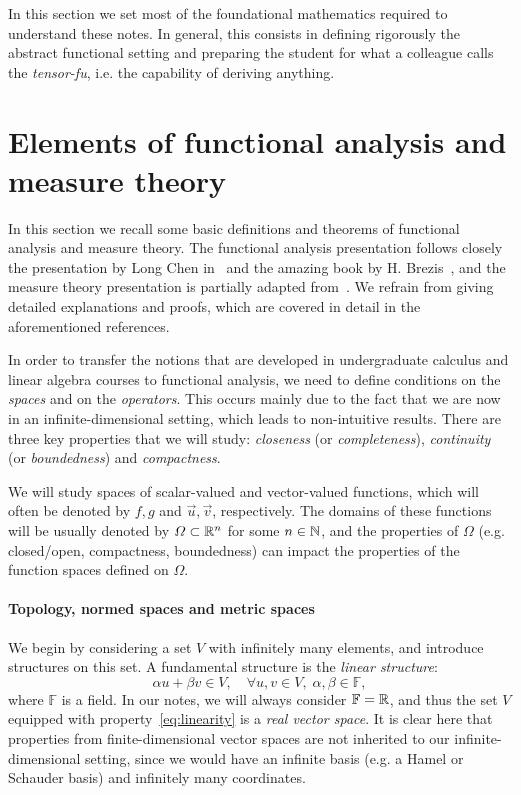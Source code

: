 In this section we set most of the foundational mathematics required to understand these notes. In general, this consists in defining rigorously the abstract functional setting and preparing the student for what a colleague calls the \emph{tensor-fu}, i.e. the capability of deriving anything.

\section{Elements of functional analysis and measure theory}\label{sec:elements-functional-analysis}
In this section we recall some basic definitions and theorems of functional analysis and measure theory. The functional analysis presentation follows closely the presentation by Long Chen in~\cite{chen2024infSup} and the amazing book by H. Brezis~\cite{BrezisFA}, and the measure theory presentation is partially adapted from~\cite{Tao_2021,Rudin_2013}. We refrain from giving detailed explanations and proofs, which are covered in detail in the aforementioned references.

In order to transfer the notions that are developed in undergraduate calculus and linear algebra courses to functional analysis, we need to define conditions on the \emph{spaces} and on the \emph{operators}. This occurs mainly due to the fact that we are now in an infinite-dimensional setting, which leads to non-intuitive results. There are three key properties that we will study: \emph{closeness} (or \emph{completeness}), \emph{continuity} (or \emph{boundedness}) and \emph{compactness}.

We will study spaces of scalar-valued and vector-valued functions, which will often be denoted by $f, g$ and $\vec u, \vec v$, respectively. The domains of these functions will be usually denoted by $\Omega\subset\mathbb{R}^n$ for some $n\in\mathbb{N}$, and the properties of $\Omega$ (e.g. closed/open, compactness, boundedness) can impact the properties of the function spaces defined on $\Omega$.

\paragraph{Topology, normed spaces and metric spaces}
We begin by considering a set $V$ with infinitely many elements, and introduce structures on this set. A fundamental structure is the \emph{linear structure}:
\begin{equation}\label{eq:linearity}
    \alpha u + \beta v \in V,\quad \forall u,v\in V, \; \alpha, \beta\in \mathbb{F},
\end{equation}
where $\mathbb{F}$ is a field. In our notes, we will always consider $\mathbb{F}=\mathbb{R}$, and thus the set $V$ equipped with property~\eqref{eq:linearity} is a \emph{real vector space}. It is clear here that properties from finite-dimensional vector spaces are not inherited to our infinite-dimensional setting, since we would have an infinite basis (e.g. a Hamel or Schauder basis) and infinitely many coordinates. 


